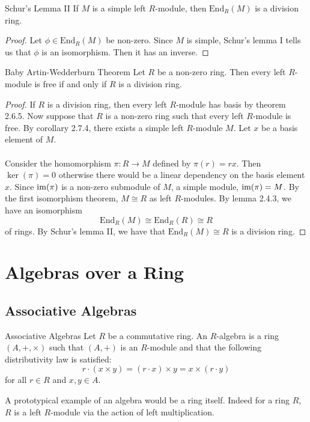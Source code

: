\documentclass[a4paper]{article}
\begin{document}
\begin{crl}{Schur's Lemma II}{} If $M$ is a simple left $R$-module, then $\text{End}_R(M)$ is a division ring. \tcbline
\begin{proof}
Let $\phi\in\text{End}_R(M)$ be non-zero. Since $M$ is simple, Schur's lemma I tells us that $\phi$ is an isomorphism. Then it has an inverse. 
\end{proof}
\end{crl}

\begin{thm}{Baby Artin-Wedderburn Theorem}{} Let $R$ be a non-zero ring. Then every left $R$-module is free if and only if $R$ is a division ring. \tcbline
\begin{proof}
If $R$ is a division ring, then every left $R$-module has basis by theorem 2.6.5. Now suppose that $R$ is a non-zero ring such that every left $R$-module is free. By corollary 2.7.4, there exists a simple left $R$-module $M$. Let $x$ be a basis element of $M$. \\~\\

Consider the homomorphism $\pi:R\to M$ defined by $\pi(r)=rx$. Then $\ker(\pi)=0$ otherwise there would be a linear dependency on the basis element $x$. Since $\operatorname{im}(\pi)$ is a non-zero submodule of $M$, a simple module, $\operatorname{im}(\pi)=M$. By the first isomorphism theorem, $M\cong R$ as left $R$-modules. By lemma 2.4.3, we have an isomorphism $$\text{End}_R(M)\cong\text{End}_R(R)\cong R$$ of rings. By Schur's lemma II, we have that $\text{End}_R(M)\cong R$ is a division ring. 
\end{proof}
\end{thm}

\pagebreak
\section{Algebras over a Ring}
\subsection{Associative Algebras}
\begin{defn}{Associative Algebras}{} Let $R$ be a commutative ring. An $R$-algebra is a ring $(A,+,\times)$ such that $(A,+)$ is an $R$-module and that the following distributivity law is satisfied: $$r\cdot(x\times y)=(r\cdot x)\times y=x\times(r\cdot y)$$ for all $r\in R$ and $x,y\in A$. 
\end{defn}

A prototypical example of an algebra would be a ring itself. Indeed for a ring $R$, $R$ is a left $R$-module via the action of left multiplication. 
\end{document}
